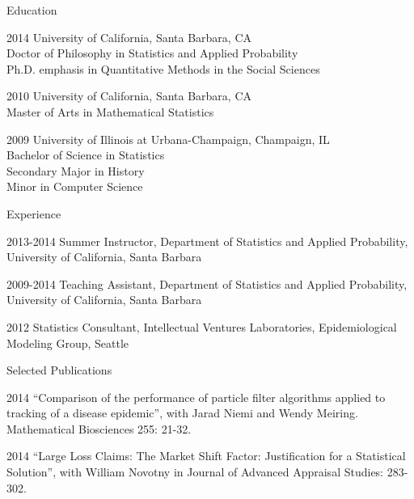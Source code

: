   \begin{vitae}

    {\small
      \begin{vitaesection}{Education}
        \vspace{-0.1cm}
      \item [2014] University of California, Santa Barbara, CA \\
      Doctor of Philosophy in Statistics and Applied Probability \\
      Ph.D. emphasis in Quantitative Methods in the Social Sciences
      \item [2010] University of California, Santa Barbara, CA \\
      Master of Arts in Mathematical Statistics
      \item [2009] University of Illinois at Urbana-Champaign, Champaign, IL \\
      Bachelor of Science in Statistics \\
      Secondary Major in History \\
      Minor in Computer Science
      \end{vitaesection}

      \begin{vitaesection}{Experience}
        \vspace{-0.1cm}
      \item [2013-2014] Summer Instructor, Department of Statistics and Applied Probability, University of California, Santa Barbara
      \item [2009-2014] Teaching Assistant, Department of Statistics and Applied Probability, University of California, Santa Barbara
      \item [2012] Statistics Consultant, Intellectual Ventures Laboratories, Epidemiological Modeling Group, Seattle
      \end{vitaesection}

      \begin{vitaesection}{Selected Publications}
        \vspace{-0.1cm}
      \item [2014] ``Comparison of the performance of particle filter algorithms applied to tracking of a disease epidemic'', with Jarad Niemi and Wendy Meiring. Mathematical Biosciences 255: 21-32.
      \item [2014] ``Large Loss Claims: The Market Shift Factor: Justification for a Statistical Solution'', with William Novotny in Journal of Advanced Appraisal Studies: 283-302.
        \vspace{0.3cm}
      \end{vitaesection}

}
\end{vitae}
